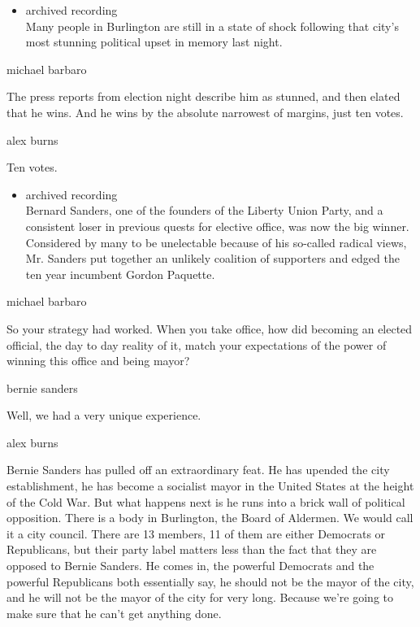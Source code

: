 \begin{itemize}
\tightlist
\item
  archived recording\\
  Many people in Burlington are still in a state of shock following that
  city's most stunning political upset in memory last night.
\end{itemize}

michael barbaro

The press reports from election night describe him as stunned, and then
elated that he wins. And he wins by the absolute narrowest of margins,
just ten votes.

alex burns

Ten votes.

\begin{itemize}
\tightlist
\item
  archived recording\\
  Bernard Sanders, one of the founders of the Liberty Union Party, and a
  consistent loser in previous quests for elective office, was now the
  big winner. Considered by many to be unelectable because of his
  so-called radical views, Mr. Sanders put together an unlikely
  coalition of supporters and edged the ten year incumbent Gordon
  Paquette.
\end{itemize}

michael barbaro

So your strategy had worked. When you take office, how did becoming an
elected official, the day to day reality of it, match your expectations
of the power of winning this office and being mayor?

bernie sanders

Well, we had a very unique experience.

alex burns

Bernie Sanders has pulled off an extraordinary feat. He has upended the
city establishment, he has become a socialist mayor in the United States
at the height of the Cold War. But what happens next is he runs into a
brick wall of political opposition. There is a body in Burlington, the
Board of Aldermen. We would call it a city council. There are 13
members, 11 of them are either Democrats or Republicans, but their party
label matters less than the fact that they are opposed to Bernie
Sanders. He comes in, the powerful Democrats and the powerful
Republicans both essentially say, he should not be the mayor of the
city, and he will not be the mayor of the city for very long. Because
we're going to make sure that he can't get anything done.


